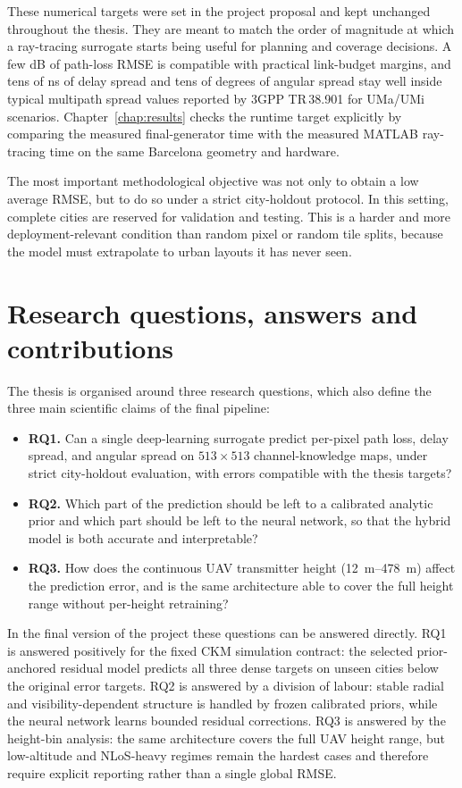 These numerical targets were set in the project proposal and kept unchanged
throughout the thesis. They are meant to match the order of magnitude at
which a ray-tracing surrogate starts being useful for planning and coverage
decisions. A few dB of path-loss RMSE is compatible with practical link-budget
margins, and tens of ns of delay spread and tens of degrees of angular spread
stay well inside typical multipath spread values reported by 3GPP TR\,38.901
for UMa/UMi scenarios. Chapter~\ref{chap:results} checks the runtime target
explicitly by comparing the measured final-generator time with the measured
MATLAB ray-tracing time on the same Barcelona geometry and hardware.

The most important methodological objective was not only to obtain a low
average RMSE, but to do so under a strict city-holdout protocol. In this
setting, complete cities are reserved for validation and testing. This is a
harder and more deployment-relevant condition than random pixel or random tile
splits, because the model must extrapolate to urban layouts it has never seen.

\section{Research questions, answers and contributions}

The thesis is organised around three research questions, which also define
the three main scientific claims of the final pipeline:

\begin{itemize}
  \item \textbf{RQ1.} Can a single deep-learning surrogate predict per-pixel
        path loss, delay spread, and angular spread on \(513\times513\)
        channel-knowledge maps, under strict city-holdout evaluation, with
        errors compatible with the thesis targets?
  \item \textbf{RQ2.} Which part of the prediction should be left to a
        calibrated analytic prior and which part should be left to the neural
        network, so that the hybrid model is both accurate and interpretable?
  \item \textbf{RQ3.} How does the continuous UAV transmitter height
        (\SIrange{12}{478}{m}) affect the prediction error, and is the same
        architecture able to cover the full height range without per-height
        retraining?
\end{itemize}

In the final version of the project these questions can be answered directly.
RQ1 is answered positively for the fixed CKM simulation contract: the selected
prior-anchored residual model predicts all three dense targets on unseen cities
below the original error targets. RQ2 is answered by a division of labour:
stable radial and visibility-dependent structure is handled by frozen calibrated
priors, while the neural network learns bounded residual corrections. RQ3 is
answered by the height-bin analysis: the same architecture covers the full UAV
height range, but low-altitude and NLoS-heavy regimes remain the hardest cases
and therefore require explicit reporting rather than a single global RMSE.

